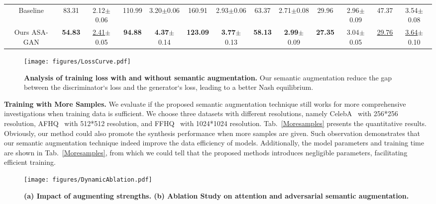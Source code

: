\documentclass[10pt,journal,compsoc]{IEEEtran}
\begin{document}
\begin{table*}
{\begin{tabular}{ccccccccccccc}
Baseline                                             & 83.31                  & 2.12$\pm$0.06             & 110.99                 & 3.20$\pm$0.06          & 160.91                 & 2.93$\pm$0.06            & 63.37                  & 2.71$\pm$0.08           & 29.96                  &  2.96$\pm$0.09                      & 47.37                  & 3.54$\pm$0.08              \\
Ours ASA-GAN                                         & \textbf{54.83}         & \underline{2.41}$\pm$0.05 & \textbf{94.88}         & \textbf{4.37}$\pm$0.14 & \textbf{123.09}        & \textbf{3.77}$\pm$0.13   & \textbf{58.13}         & \textbf{2.99}$\pm$0.09  & \textbf{27.35}         & 3.04$\pm$0.05                       & \underline{29.76}      & \underline{3.64}$\pm$0.10  \\ \hline
\end{tabular}
}
\end{table*}

\begin{figure}
  \vspace{-4mm}
  \centering
  \texttt{[image: figures/LossCurve.pdf]}
  \caption{\textbf{Analysis of training loss with and without semantic augmentation.}
  Our semantic augmentation reduce the gap between the discriminator`s loss and the generator`s loss, leading to a better Nash equilibrium.}
  \label{LossCurve}
  \vspace{-1mm}
\end{figure}

\textbf{Training with More Samples.}
We evaluate if the proposed semantic augmentation technique still works for more comprehensive investigations when training data is sufficient.
We choose three datasets with different resolutions, namely CelebA~\cite{liu2015faceattributes} with 256*256 resolution, AFHQ~\cite{choi2020stargan} with 512*512 resolution, and FFHQ~\cite{karras2019style} with 1024*1024 resolution.
Tab.~\ref{Moresamples} presents the quantitative results.
Obviously, our method could also promote the synthesis performance when more samples are given.
Such observation demonstrates that our semantic augmentation technique indeed improve the data efficiency of models.
Additionally, the model parameters and training time are shown in Tab.~\ref{Moresamples}, from which we could tell that the proposed methods introduces negligible parameters, facilitating efficient training.
\begin{figure}
  \centering
  \texttt{[image: figures/DynamicAblation.pdf]}
  \caption{\textbf{(a) Impact of augmenting strengths. (b) Ablation Study on attention and adversarial semantic augmentation.}}
  \label{Fig:Lambda}
  \vspace{-2mm}
\end{figure}
\end{document}
